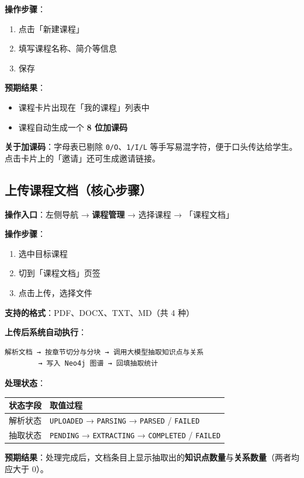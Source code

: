 \documentclass[UTF8,a4paper,11pt]{ctexrep}
\begin{document}
\textbf{操作步骤}：

\begin{enumerate}
\item 点击「新建课程」
\item 填写课程名称、简介等信息
\item 保存
\end{enumerate}
\textbf{预期结果}：

\begin{itemize}
\item 课程卡片出现在「我的课程」列表中
\item 课程自动生成一个 \textbf{8 位加课码}
\end{itemize}
\textbf{关于加课码}：字母表已剔除 \texttt{0/O}、\texttt{1/I/L} 等手写易混字符，便于口头传达给学生。点击卡片上的「邀请」还可生成邀请链接。


\subsection{上传课程文档（核心步骤）}

\textbf{操作入口}：左侧导航 → \textbf{课程管理} → 选择课程 → 「课程文档」

\textbf{操作步骤}：

\begin{enumerate}
\item 选中目标课程
\item 切到「课程文档」页签
\item 点击上传，选择文件
\end{enumerate}
\textbf{支持的格式}：PDF、DOCX、TXT、MD（共 4 种）

\textbf{上传后系统自动执行}：

\begin{Verbatim}[breaklines=true,breakanywhere=true,fontsize=\small,frame=single,framesep=4pt,rulecolor=\color{codeframe}]
解析文档 → 按章节切分与分块 → 调用大模型抽取知识点与关系
        → 写入 Neo4j 图谱 → 回填抽取统计
\end{Verbatim}

\textbf{处理状态}：

\begin{center}
\small
\begin{tabularx}{\linewidth}{@{}XX@{}}
\toprule
状态字段 & 取值过程 \\
\midrule
解析状态 & \texttt{UPLOADED} → \texttt{PARSING} → \texttt{PARSED} / \texttt{FAILED} \\
抽取状态 & \texttt{PENDING} → \texttt{EXTRACTING} → \texttt{COMPLETED} / \texttt{FAILED} \\
\bottomrule
\end{tabularx}
\end{center}
\textbf{预期结果}：处理完成后，文档条目上显示抽取出的\textbf{知识点数量}与\textbf{关系数量}（两者均应大于 0）。
\end{document}
